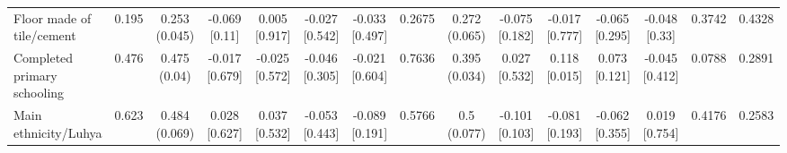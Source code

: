 {\begin{tabular}[t]{lcccccccccccccc}
\addlinespace[0.3em]
\hline
\multicolumn{15}{l}{\textit{\textbf{Panel B: Baseline demographics, $N=1,995$}}}\\
\hline
\hspace{1em}Floor made of tile/cement & 0.195 & \makecell[c]{0.253\\(0.045)} & \makecell[c]{-0.069\\{[0.11]}} & \makecell[c]{0.005\\{[0.917]}} & \makecell[c]{-0.027\\{[0.542]}} & \makecell[c]{-0.033\\{[0.497]}} & 0.2675 & \makecell[c]{0.272\\(0.065)} & \makecell[c]{-0.075\\{[0.182]}} & \makecell[c]{-0.017\\{[0.777]}} & \makecell[c]{-0.065\\{[0.295]}} & \makecell[c]{-0.048\\{[0.33]}} & 0.3742 & 0.4328\\
\hspace{1em}Completed primary schooling & 0.476 & \makecell[c]{0.475\\(0.04)} & \makecell[c]{-0.017\\{[0.679]}} & \makecell[c]{-0.025\\{[0.572]}} & \makecell[c]{-0.046\\{[0.305]}} & \makecell[c]{-0.021\\{[0.604]}} & 0.7636 & \makecell[c]{0.395\\(0.034)} & \makecell[c]{0.027\\{[0.532]}} & \makecell[c]{0.118\\{[0.015]}} & \makecell[c]{0.073\\{[0.121]}} & \makecell[c]{-0.045\\{[0.412]}} & 0.0788 & 0.2891\\
\hspace{1em}Main ethnicity/Luhya & 0.623 & \makecell[c]{0.484\\(0.069)} & \makecell[c]{0.028\\{[0.627]}} & \makecell[c]{0.037\\{[0.532]}} & \makecell[c]{-0.053\\{[0.443]}} & \makecell[c]{-0.089\\{[0.191]}} & 0.5766 & \makecell[c]{0.5\\(0.077)} & \makecell[c]{-0.101\\{[0.103]}} & \makecell[c]{-0.081\\{[0.193]}} & \makecell[c]{-0.062\\{[0.355]}} & \makecell[c]{0.019\\{[0.754]}} & 0.4176 & 0.2583\\

\end{tabular}}

